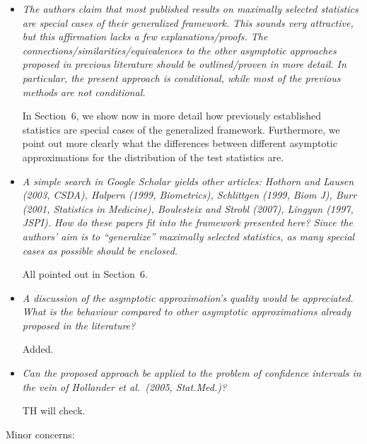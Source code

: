 \documentclass[11pt,a4paper]{article}
\begin{document}
\begin{itemize}

  \item \textit{The authors claim that most published results on maximally selected
        statistics are special cases of their generalized framework. This sounds very
	attractive, but this affirmation lacks a few explanations/proofs. The
        connections/similarities/equivalences to the other asymptotic approaches
        proposed in previous literature should be outlined/proven in more detail. In
        particular, the present approach is conditional, while most of the previous
        methods are not conditional.}
	
	In Section~6, we show now in more detail how previously established statistics
	are special cases of the generalized framework. Furthermore, we point out 
	more clearly what the differences between different asymptotic approximations
	for the distribution of the test statistics are.
	
  \item \textit{A simple search in Google Scholar yields other articles: Hothorn and
        Lausen (2003, CSDA), Halpern (1999, Biometrics), Schlittgen (1999, Biom J),
	Burr (2001, Statistics in Medicine), Boulesteix and Strobl (2007),
	Lingyun (1997, JSPI). How do these papers fit into the framework presented here?
	Since the authors' aim is to ``generalize'' maximally selected statistics, as
	many special cases as possible should be enclosed.}
	
	All pointed out in Section~6.
	
  \item \textit{A discussion of the asymptotic approximation's quality would be appreciated.
        What is the behaviour compared to other asymptotic approximations already
        proposed in the literature?}
	
	Added.
	
  \item \textit{Can the proposed approach be applied to the problem of confidence
        intervals in the vein of Hollander et al.\ (2005, Stat.Med.)?}
	
	TH will check.
	
\end{itemize}

Minor concerns:
\end{document}
